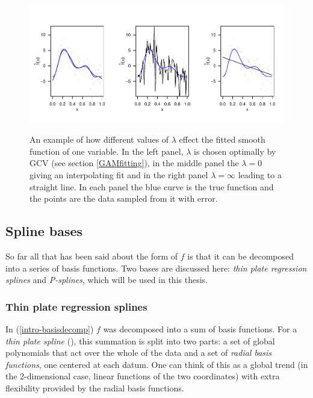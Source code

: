\begin{figure}[tb]
\centering
\includegraphics[width=6in]{intro/figs/lambda-ex.pdf}\\
\caption{An example of how different values of $\lambda$ effect the fitted smooth function of one variable. In the left panel, $\lambda$ is chosen optimally by GCV (see section \ref{GAMfitting}), in the middle panel the $\lambda=0$ giving an interpolating fit and in the right panel $\lambda=\infty$ leading to a straight line. In each panel the blue curve is the true function and the points are the data sampled from it with error.}
\label{lambda-ex}
\end{figure}


\subsection{Spline bases}

So far all that has been said about the form of $f$ is that it can be decomposed into a series of basis functions. Two bases are discussed here: \textit{thin plate regression splines} and \textit{P-splines}, which will be used in this thesis.

\subsubsection{Thin plate regression splines}
\label{GAMtprs}
\label{GAMtprspenalty}

In (\ref{intro-basisdecomp}) $f$ was decomposed into a sum of basis functions. For a \textit{thin plate spline} (\cite{duchon77}), this summation is split into two parts: a set of global polynomials that act over the whole of the data and a set of \textit{radial basis functions}, one centered at each datum. One can think of this as a global trend (in the 2-dimensional case, linear functions of the two coordinates) with extra flexibility provided by the radial basis functions.

